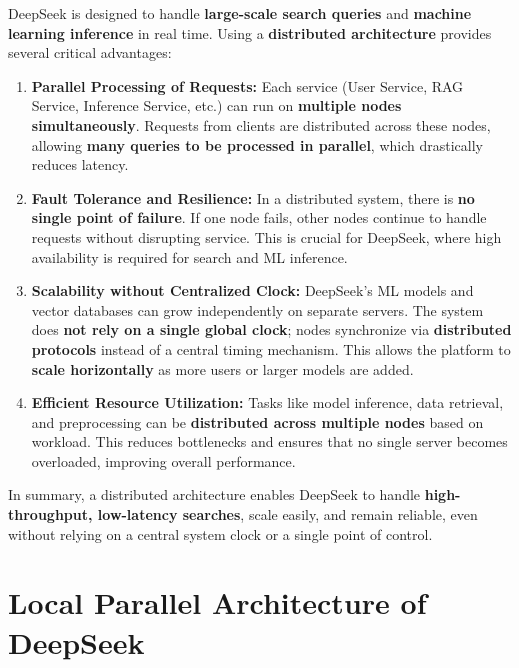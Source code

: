 \documentclass[a4paper,11pt]{article}
\begin{document}
DeepSeek is designed to handle \textbf{large-scale search queries} and \textbf{machine learning inference} in real time. Using a \textbf{distributed architecture} provides several critical advantages:

\begin{enumerate}
    \item \textbf{Parallel Processing of Requests:} 
    Each service (User Service, RAG Service, Inference Service, etc.) can run on \textbf{multiple nodes simultaneously}. Requests from clients are distributed across these nodes, allowing \textbf{many queries to be processed in parallel}, which drastically reduces latency.
    
    \item \textbf{Fault Tolerance and Resilience:} 
    In a distributed system, there is \textbf{no single point of failure}. If one node fails, other nodes continue to handle requests without disrupting service. This is crucial for DeepSeek, where high availability is required for search and ML inference.
    
    \item \textbf{Scalability without Centralized Clock:} 
    DeepSeek’s ML models and vector databases can grow independently on separate servers. The system does \textbf{not rely on a single global clock}; nodes synchronize via \textbf{distributed protocols} instead of a central timing mechanism. This allows the platform to \textbf{scale horizontally} as more users or larger models are added.
    
    \item \textbf{Efficient Resource Utilization:} 
    Tasks like model inference, data retrieval, and preprocessing can be \textbf{distributed across multiple nodes} based on workload. This reduces bottlenecks and ensures that no single server becomes overloaded, improving overall performance.
\end{enumerate}

\noindent In summary, a distributed architecture enables DeepSeek to handle \textbf{high-throughput, low-latency searches}, scale easily, and remain reliable, even without relying on a central system clock or a single point of control.
\section{Local Parallel Architecture of DeepSeek}
\end{document}
